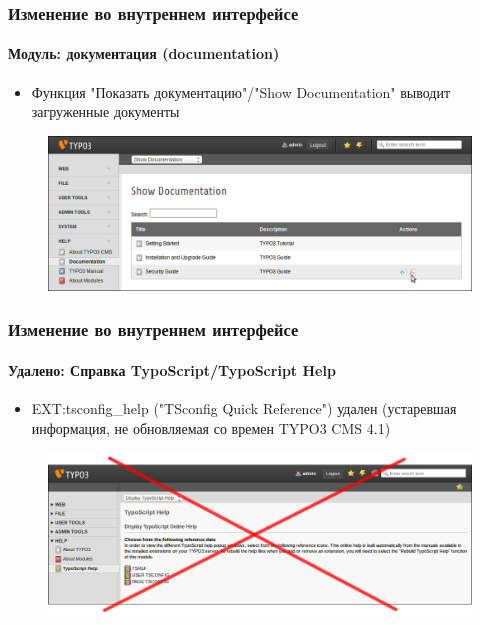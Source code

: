 
\begin{frame}[fragile]
	\frametitle{Изменение во внутреннем интерфейсе}
	\framesubtitle{Модуль: документация (documentation)}

	\begin{itemize}
		\item Функция "Показать документацию"/"Show Documentation" выводит загруженные документы
	\end{itemize}

	\begin{figure}
		\includegraphics[width=0.95\linewidth]{Images/BackendChanges/ShowDocumentation.png}
	\end{figure}

\end{frame}


\begin{frame}[fragile]
	\frametitle{Изменение во внутреннем интерфейсе}
	\framesubtitle{Удалено: Справка TypoScript/TypoScript Help}

 	\begin{itemize}
		\item EXT:tsconfig\_help ("TSconfig Quick Reference") удален\newline
			\small(устаревшая информация, не обновляемая со времен TYPO3 CMS 4.1)
	\end{itemize}

	\begin{figure}
		\includegraphics[width=0.95\linewidth]{Images/BackendChanges/TypoScriptHelpRemovedCrossed.png}
	\end{figure}

\end{frame}


